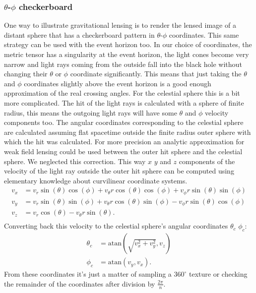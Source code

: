 \documentclass[pdftex,12pt,a4paper]{article}
\begin{document}
	\subsubsection{$\theta$-$\phi$ checkerboard}
		\label{angleSection}
		One way to illustrate gravitational lensing is to render the lensed image of a distant sphere that has a checkerboard pattern in $\theta$-$\phi$ coordinates. This same strategy can be used with the event horizon too. In our choice of coordinates, the metric tensor has a singularity at the event horizon, the light cones become very narrow and light rays coming from the outside fall into the black hole without changing their $\theta$ or $\phi$ coordinate significantly. This means that just taking the $\theta$ and $\phi$ coordinates slightly above the event horizon is a good enough approximation of the real crossing angles. For the celestial sphere this is a bit more complicated. The hit of the light rays is calculated with a sphere of finite radius, this means the outgoing light rays will have some $\theta$ and $\phi$ velocity components too. The angular coordinates corresponding to the celestial sphere are calculated assuming flat spacetime outside the finite radius outer sphere with which the hit was calculated. For more precision an analytic approximation for weak field lensing could be used between the outer hit sphere and the celestial sphere. We neglected this correction. This way $x$ $y$ and $z$ components of the velocity of the light ray outside the outer hit sphere can be computed using elementary knowledge about curvilinear coordinate systems.
		\begin{equation}
		\begin{aligned}
			v_x &= v_r\sin(\theta)\cos(\phi) + v_\theta r\cos(\theta)\cos(\phi) + v_\phi r\sin(\theta)\sin(\phi)\\
			v_y &= v_r\sin(\theta)\sin(\phi) + v_\theta r\cos(\theta)\sin(\phi) - v_\phi r\sin(\theta)\cos(\phi)\\
			v_z &= v_r\cos(\theta) - v_\theta r\sin(\theta).\\
		\end{aligned}
		\end{equation}
		Converting back this velocity to the celestial sphere's angular coordinates $\theta_c$ $\phi_c$:
		\begin{equation}
		\begin{aligned}
			\theta_c &= \mathrm{atan}(\sqrt{v_x^2+v_y^2}, v_z)\\
			\phi_c   &= \mathrm{atan}(v_y, v_x).
		\end{aligned}
		\end{equation}
		From these coordinates it's just a matter of sampling a $360^\circ$ texture or checking the remainder of the coordinates after division by $\frac{2\pi}{n}$.
\end{document}
